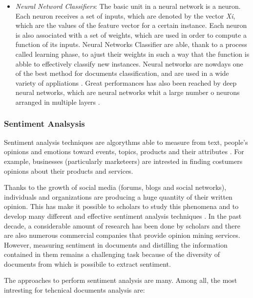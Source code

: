 \documentclass[]{book}
\begin{document}
\begin{itemize}
  \citep{pop2006approach}.
\item
  \emph{Neural Netword Classifiers}: The basic unit in a neural network
  is a neuron. Each neuron receives a set of inputs, which are denoted
  by the vector \emph{Xi}, which are the values of the feature vector
  for a certain instance. Each neuron is also associated with a set of
  weights, which are used in order to compute a function of its inputs.
  Neural Networks Classifier are able, thank to a process called
  learning phase, to ajust their weights in such a way that the function
  is abble to effectively classify new instances. Neural networks are
  nowdays one of the best method for documents classification, and are
  used in a wide variety of appliations \citep{manevitz2007one}. Great
  performances has also been reached by deep neural networks, which are
  neural networks whit a large number o neurons arranged in multiple
  layers \citep[\citet{kim2014convolutional}]{lai2015recurrent}.
\end{itemize}

\subsubsection{Sentiment Analsysis}\label{sotatoolsmodelsentanal}

Sentiment analysis techniques are algorythms able to measure from text,
people's opinions and emotions toward events, topics, products and their
attributes \citep{pang2008opinion}. For example, businesses
(particularly marketeers) are intrested in finding costumers opinions
about their products and services.

Thanks to the growth of social media (forums, blogs and social
networks), individuals and organizations are producing a huge quantity
of their written opinion. This has make it possible to scholars to study
this phenomena and to develop many different and effective sentiment
analysis techniques \citep{liu2012survey}. In the past decade, a
considerable amount of research has been done by scholars and there are
also numerous commercial companies that provide opinion mining services.
However, measuring sentiment in documents and distilling the information
contained in them remains a challenging task because of the diversity of
documents from which is possibile to extract sentiment.

The approaches to perform sentiment analysis are many. Among all, the
most intresting for tehcnical documents analysis are:
\end{document}
